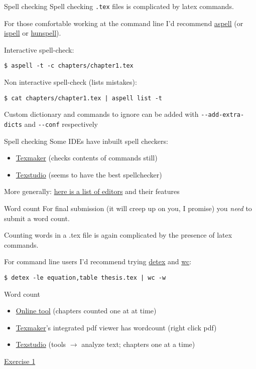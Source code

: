\begin{frame}[fragile]{Spell checking}
Spell checking \texttt{.tex} files is complicated by latex commands.

For those comfortable working at the command line I'd recommend
\href{http://aspell.net/}{aspell} 
(or \href{https://www.gnu.org/software/ispell/}{ispell}
or \href{http://hunspell.github.io/}{hunspell}).

Interactive spell-check:
\begin{lstlisting}
$ aspell -t -c chapters/chapter1.tex
\end{lstlisting}
Non interactive spell-check (lists mistakes):
\begin{lstlisting}
$ cat chapters/chapter1.tex | aspell list -t
\end{lstlisting}%
Custom dictionary and commands to ignore can be added with
\lstinline|--add-extra-dicts| and \lstinline|--conf| respectively
\end{frame}

\begin{frame}[fragile]{Spell checking}
Some IDEs have inbuilt spell checkers:
\begin{itemize}
  \item \href{http://www.xm1math.net/texmaker/}{Texmaker}
	  (checks contents of commands still)
  \item \href{https://www.texstudio.org/}{Texstudio} (seems to have the best
	   spellchecker)
\end{itemize}
More generally:
\href{https://tex.stackexchange.com/questions/339/latex-editors-ides}%
{here is a list of editors} and their features
\end{frame}

\begin{frame}[fragile]{Word count}
For final submission (it will creep up on you, I promise) you \textsl{need}
to submit a word count.

Counting words in a .tex file is again complicated by the presence of latex
commands.

For command line users I'd recommend trying
\href{https://www.freebsd.org/cgi/man.cgi?query=detex}{detex} and 
\href{http://pubs.opengroup.org/onlinepubs/9699919799/utilities/wc.html}{wc}:
\begin{lstlisting}
$ detex -le equation,table thesis.tex | wc -w
\end{lstlisting}
\end{frame}

\begin{frame}{Word count}
\begin{itemize}
\item \href{http://app.uio.no/ifi/texcount/online.php}{Online tool}
	  (chapters counted one at at time)
\item \href{http://www.xm1math.net/texmaker/}{Texmaker}'s integrated pdf
	   viewer has wordcount (right click pdf)
\item \href{https://www.texstudio.org/}{Texstudio} (tools $\rightarrow$
	  analyze text; chapters one at a time)
\end{itemize}
\end{frame}

\begin{frame}[standout]
\href{https://jwalton.info/assets/teaching/latex/exercise_1.pdf}%
{\color{white}Exercise 1}
\end{frame}
